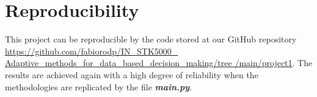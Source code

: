 \section{Reproducibility}
\label{chap:Reproducibility}

This project can be reproducible by the code stored at our GitHub repository \href{https://github.com/fabiorodp/IN_STK5000_Adaptive_methods_for_data_based_decision_making/tree/main/project1}{https://github.com/fabiorodp/IN\_STK5000\_ Adaptive\_methods\_for\_data\_based\_decision\_making/tree /main/project1}. The results are achieved again with a high degree of reliability when the methodologies are replicated by the file \textbf{\textit{main.py}}.
